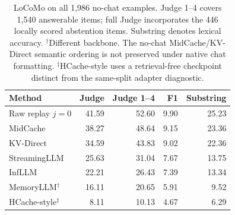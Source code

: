 \begin{table}[htbp]
\centering
\small
\setlength{\tabcolsep}{4pt}
\begin{tabular}{@{}lrrrr@{}}
\toprule
Method & Judge & Judge 1--4 & F1 & Substring \\
\midrule
Raw replay $j=0$ & 41.59 & 52.60 & 9.90 & 25.23 \\
MidCache & 38.27 & 48.64 & 9.15 & 23.36 \\
KV-Direct & 34.59 & 43.83 & 9.02 & 22.36 \\
StreamingLLM & 25.63 & 31.04 & 7.67 & 13.75 \\
InfLLM & 22.21 & 26.43 & 7.39 & 13.34 \\
MemoryLLM$^\dagger$ & 16.11 & 20.65 & 5.91 & 9.52 \\
HCache-style$^{\ddagger}$ & 8.11 & 10.13 & 4.67 & 6.29 \\
\bottomrule
\end{tabular}
\caption{LoCoMo on all 1,986 no-chat examples. Judge 1--4 covers 1,540 answerable items; full Judge incorporates the 446 locally scored abstention items. Substring denotes lexical accuracy. $^\dagger$Different backbone. The no-chat MidCache/KV-Direct semantic ordering is not preserved under native chat formatting. $^{\ddagger}$HCache-style uses a retrieval-free checkpoint distinct from the same-split adapter diagnostic.}
\label{tab:locomo-detail}
\end{table}
